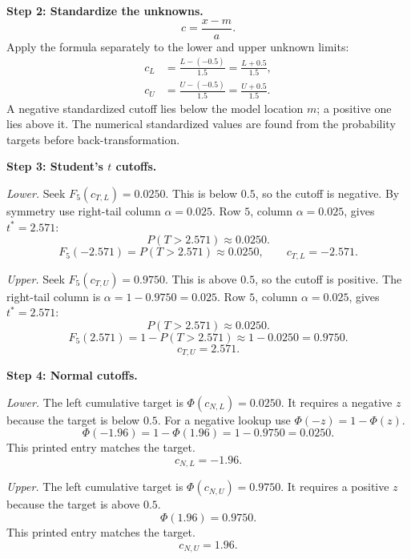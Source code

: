 \begin{enumerate}[leftmargin=*,label=\textbf{\arabic*.},itemsep=12pt,parsep=3pt,topsep=5pt]
\begin{minipage}[t]{\linewidth}
\end{minipage}\par
\par\noindent\begin{minipage}{\linewidth}
\par\textbf{Step 2: Standardize the unknowns.}\nopagebreak\enspace \[
c=\frac{x-m}{a}.
\]
Apply the formula separately to the lower and upper unknown limits:
\[
\begin{aligned}c_L&=\frac{L-(-0.5)}{1.5}=\frac{L+0.5}{1.5},\\c_U&=\frac{U-(-0.5)}{1.5}=\frac{U+0.5}{1.5}.\end{aligned}
\]
A negative standardized cutoff lies below the model location $m$; a positive one lies above it. The numerical standardized values are found from the probability targets before back-transformation.
\end{minipage}\par
\par\noindent\begin{minipage}{\linewidth}
\par\textbf{Step 3: Student's $t$ cutoffs.}\nopagebreak\enspace \par\textit{Lower.} Seek $F_{5}(c_{T,L})=0.0250$. This is below $0.5$, so the cutoff is negative. By symmetry use right-tail column $\alpha=0.025$. Row $5$, column $\alpha=0.025$, gives $t^*=2.571$:\[
P(T>2.571)\approx0.0250.
\]
\[
F_{5}(-2.571)=P(T>2.571)\approx0.0250,\qquad c_{T,L}=-2.571.
\]
\par\textit{Upper.} Seek $F_{5}(c_{T,U})=0.9750$. This is above $0.5$, so the cutoff is positive. The right-tail column is $\alpha=1-0.9750=0.025$. Row $5$, column $\alpha=0.025$, gives $t^*=2.571$:\[
P(T>2.571)\approx0.0250.
\]
\[
F_{5}(2.571)=1-P(T>2.571)\approx1-0.0250=0.9750.
\]
\[
c_{T,U}=2.571.
\]

\end{minipage}\par
\par\textbf{Step 4: Normal cutoffs.}\nopagebreak\enspace \par\noindent\begin{minipage}{\linewidth}
\par\textit{Lower.} The left cumulative target is $\Phi(c_{N,L})=0.0250$. It requires a negative $z$ because the target is below $0.5$. For a negative lookup use $\Phi(-z)=1-\Phi(z)$.\[
\Phi(-1.96)=1-\Phi(1.96)=1-0.9750=0.0250.
\]
This printed entry matches the target.\[
c_{N,L}=-1.96.
\]
\end{minipage}\par
\par\noindent\begin{minipage}{\linewidth}
\par\textit{Upper.} The left cumulative target is $\Phi(c_{N,U})=0.9750$. It requires a positive $z$ because the target is above $0.5$.\[
\Phi(1.96)=0.9750.
\]
This printed entry matches the target.\[
c_{N,U}=1.96.
\]
\end{minipage}\par


\end{enumerate}

